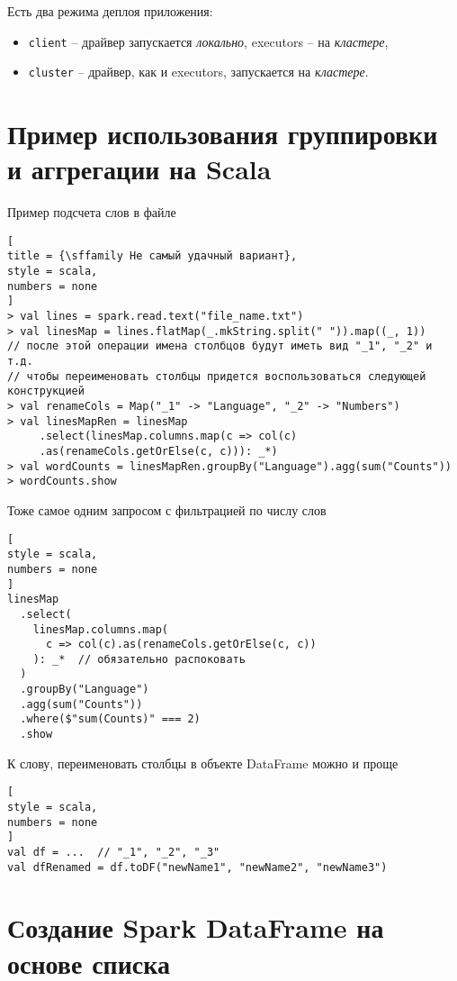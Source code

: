 \documentclass[%
	11pt,
	a4paper,
	utf8,
		]{article}
\begin{document}
Есть два режима деплоя приложения:
\begin{itemize}
	\item \texttt{client} -- драйвер запускается \emph{локально}, executors -- на \emph{кластере},
	
	\item \texttt{cluster} -- драйвер, как и executors, запускается на \emph{кластере}.
\end{itemize}

\section{Пример использования группировки и аггрегации на Scala}

Пример подсчета слов в файле
\begin{lstlisting}[
title = {\sffamily Не самый удачный вариант},
style = scala,
numbers = none	
]
> val lines = spark.read.text("file_name.txt")
> val linesMap = lines.flatMap(_.mkString.split(" ")).map((_, 1))
// после этой операции имена столбцов будут иметь вид "_1", "_2" и т.д.
// чтобы переименовать столбцы придется воспользоваться следующей конструкцией
> val renameCols = Map("_1" -> "Language", "_2" -> "Numbers")
> val linesMapRen = linesMap
     .select(linesMap.columns.map(c => col(c)
     .as(renameCols.getOrElse(c, c))): _*)
> val wordCounts = linesMapRen.groupBy("Language").agg(sum("Counts"))
> wordCounts.show
\end{lstlisting}

Тоже самое одним запросом с фильтрацией по числу слов
\begin{lstlisting}[
style = scala,
numbers = none	
]
linesMap
  .select(
    linesMap.columns.map(
      c => col(c).as(renameCols.getOrElse(c, c))
    ): _*  // обязательно распоковать
  )
  .groupBy("Language")
  .agg(sum("Counts"))
  .where($"sum(Counts)" === 2)
  .show
\end{lstlisting}

К слову, переименовать столбцы в объекте DataFrame можно и проще 
\begin{lstlisting}[
style = scala,
numbers = none	
]
val df = ...  // "_1", "_2", "_3"
val dfRenamed = df.toDF("newName1", "newName2", "newName3")
\end{lstlisting}


\section{Создание Spark DataFrame на основе списка}
\end{document}

